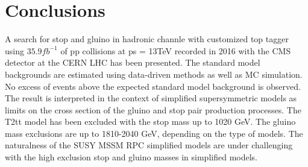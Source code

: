 \chapter{Conclusions}

A search for stop and gluino in hadronic channle with customized top tagger using $35.9 fb^{-1}$ of pp collisions at ps = 13TeV recorded in 2016 with the CMS detector
at the CERN LHC has been presented. The standard model backgrounds are estimated using data-driven methods as well as MC simulation. No excess of events above the expected standard model background is observed. The result is interpreted in the context of simplified supersymmetric models as limits on the cross section of the gluino and stop pair production processes. The T2tt model has been excluded with the stop mass up to 1020 GeV. The gluino mass exclusions are up to 1810-2040 GeV, depending on the type of models. The naturalness of the SUSY MSSM RPC simplified models are under challenging with the high exclusion stop and gluino masses in simplified models.
